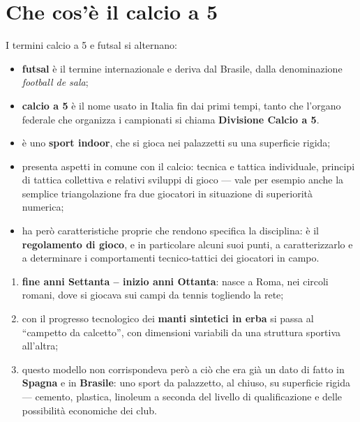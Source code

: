 \section{Che cos'è il calcio a 5}

I termini calcio a 5 e futsal si alternano:
\begin{itemize}
  \item \textbf{futsal} è il termine internazionale e deriva dal Brasile, dalla denominazione
    \textit{football de sala};
  \item \textbf{calcio a 5} è il nome usato in Italia fin dai primi tempi, tanto che l'organo
    federale che organizza i campionati si chiama \textbf{Divisione Calcio a 5}.
\end{itemize}

\begin{itemize}
  \item è uno \textbf{sport indoor}, che si gioca nei palazzetti su una superficie rigida;
  \item presenta aspetti in comune con il calcio: tecnica e tattica individuale, principi di tattica
    collettiva e relativi sviluppi di gioco --- vale per esempio anche la semplice triangolazione
    fra due giocatori in situazione di superiorità numerica;
  \item ha però caratteristiche proprie che rendono specifica la disciplina: è il
    \textbf{regolamento di gioco}, e in particolare alcuni suoi punti, a caratterizzarlo e a
    determinare i comportamenti tecnico-tattici dei giocatori in campo.
\end{itemize}

\begin{enumerate}
  \item \textbf{fine anni Settanta -- inizio anni Ottanta}: nasce a Roma, nei circoli romani, dove
    si giocava sui campi da tennis togliendo la rete;
  \item con il progresso tecnologico dei \textbf{manti sintetici in erba} si passa al ``campetto da
    calcetto'', con dimensioni variabili da una struttura sportiva all'altra;
  \item questo modello non corrispondeva però a ciò che era già un dato di fatto in \textbf{Spagna}
    e in \textbf{Brasile}: uno sport da palazzetto, al chiuso, su superficie rigida --- cemento,
    plastica, linoleum a seconda del livello di qualificazione e delle possibilità economiche dei
    club.
\end{enumerate}

